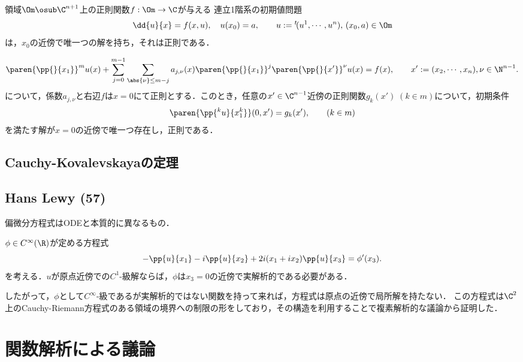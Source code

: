 \documentclass[uplatex,dvipdfmx]{jsreport}
\begin{document}
\begin{theorem}[Cauchy]
    領域$\Om\osub\C^{n+1}$上の正則関数$f:\Om\to\C$が与える
    連立1階系の初期値問題
    \[\dd{u}{x}=f(x,u),\quad u(x_0)=a,\qquad u:={}^t\!(u^1,\cdots,u^n),\,(x_0,a)\in\Om\]
    は，$x_0$の近傍で唯一つの解を持ち，それは正則である．
\end{theorem}

\begin{theorem}
    \[\paren{\pp{}{x_1}}^mu(x)+\sum_{j=0}^{m-1}\sum_{\abs{\nu}\le m-j}a_{j,\nu}(x)\paren{\pp{}{x_1}}^j\paren{\pp{}{x'}}^\nu u(x)=f(x),\qquad x':=(x_2,\cdots,x_n),\nu\in\N^{n-1}.\]
    について，係数$a_{j,\nu}$と右辺$f$は$x=0$にて正則とする．このとき，任意の$x'\in\C^{n-1}$近傍の正則関数$g_k(x')\;(k\in m)$について，初期条件
    \[\paren{\pp{^ku}{x_1^k}}(0,x')=g_k(x'),\qquad(k\in m)\]
    を満たす解が$x=0$の近傍で唯一つ存在し，正則である．
\end{theorem}

\section{Cauchy-Kovalevskayaの定理}

\section{Hans Lewy (57)}

\begin{tcolorbox}[colframe=ForestGreen, colback=ForestGreen!10!white,breakable,colbacktitle=ForestGreen!40!white,coltitle=black,fonttitle=\bfseries\sffamily,
title=]
    偏微分方程式はODEと本質的に異なるもの．
\end{tcolorbox}

\begin{theorem}[Lewy (57)]
    $\phi\in C^\infty(\R)$が定める方程式
    \[-\pp{u}{x_1}-i\pp{u}{x_2}+2i(x_1+ix_2)\pp{u}{x_3}=\phi'(x_3).\]
    を考える．$u$が原点近傍での$C^1$-級解ならば，$\phi$は$x_3=0$の近傍で実解析的である必要がある．
\end{theorem}
\begin{remarks}
    したがって，$\phi$として$C^\infty$-級であるが実解析的ではない関数を持って来れば，方程式は原点の近傍で局所解を持たない．
    この方程式は$\C^2$上のCauchy-Riemann方程式のある領域の境界への制限の形をしており，その構造を利用することで複素解析的な議論から証明した．
\end{remarks}

\chapter{関数解析による議論}
\end{document}
